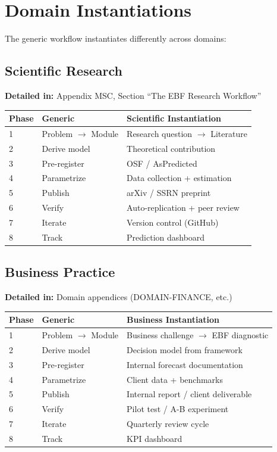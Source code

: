 \section{Domain Instantiations}
\label{sec:apply-domains}

The generic workflow instantiates differently across domains:

\subsection{Scientific Research}

\textbf{Detailed in:} Appendix MSC, Section ``The EBF Research Workflow''

\begin{center}
\small
\begin{tabular}{@{}lll@{}}
\toprule
\textbf{Phase} & \textbf{Generic} & \textbf{Scientific Instantiation} \\
\midrule
1 & Problem $\to$ Module & Research question $\to$ Literature \\
2 & Derive model & Theoretical contribution \\
3 & Pre-register & OSF / AsPredicted \\
4 & Parametrize & Data collection + estimation \\
5 & Publish & arXiv / SSRN preprint \\
6 & Verify & Auto-replication + peer review \\
7 & Iterate & Version control (GitHub) \\
8 & Track & Prediction dashboard \\
\bottomrule
\end{tabular}
\end{center}

\subsection{Business Practice}

\textbf{Detailed in:} Domain appendices (DOMAIN-FINANCE, etc.)

\begin{center}
\small
\begin{tabular}{@{}lll@{}}
\toprule
\textbf{Phase} & \textbf{Generic} & \textbf{Business Instantiation} \\
\midrule
1 & Problem $\to$ Module & Business challenge $\to$ EBF diagnostic \\
2 & Derive model & Decision model from framework \\
3 & Pre-register & Internal forecast documentation \\
4 & Parametrize & Client data + benchmarks \\
5 & Publish & Internal report / client deliverable \\
6 & Verify & Pilot test / A-B experiment \\
7 & Iterate & Quarterly review cycle \\
8 & Track & KPI dashboard \\
\bottomrule
\end{tabular}
\end{center}

